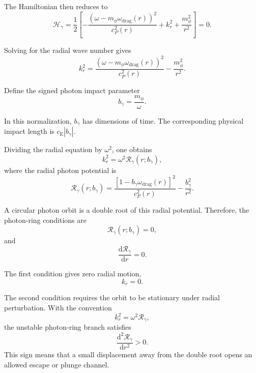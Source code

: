 The Hamiltonian then reduces to
\begin{equation}
    \mathcal{H}_{\gamma} = \frac{1}{2} \left[ - \frac{\left(\omega - m_{\phi}\omega_{\mathrm{drag}}(r)\right)^2}{c_P^2(r)} + k_r^2 + \frac{m_{\phi}^2}{r^2} \right] = 0.
\end{equation}

Solving for the radial wave number gives
\begin{equation}
    k_r^2 = \frac{\left(\omega - m_{\phi}\omega_{\mathrm{drag}}(r)\right)^2}{c_P^2(r)} - \frac{m_{\phi}^2}{r^2}.
\end{equation}

Define the signed photon impact parameter
\begin{equation}
    b_{\gamma} = \frac{m_{\phi}}{\omega}.
\end{equation}

In this normalization, $b_{\gamma}$ has dimensions of time. The corresponding physical impact length is $c_{\mathrm{E}}|b_{\gamma}|$.

Dividing the radial equation by $\omega^2$, one obtains
\begin{equation}
    k_r^2 = \omega^2 \mathcal{R}_{\gamma}(r;b_{\gamma}),
\end{equation}
where the radial photon potential is
\begin{equation}
    \mathcal{R}_{\gamma}(r;b_{\gamma}) = \frac{\left[ 1 - b_{\gamma}\omega_{\mathrm{drag}}(r) \right]^2}{c_P^2(r)} - \frac{b_{\gamma}^2}{r^2}.
\end{equation}

A circular photon orbit is a double root of this radial potential. Therefore, the photon-ring conditions are
\begin{equation}
    \mathcal{R}_{\gamma}(r;b_{\gamma}) = 0,
\end{equation}
and
\begin{equation}
    \frac{\mathrm{d}\mathcal{R}_{\gamma}}{\mathrm{d}r} = 0.
\end{equation}

The first condition gives zero radial motion,
\begin{equation}
    k_r = 0.
\end{equation}

The second condition requires the orbit to be stationary under radial perturbation. With the convention
\begin{equation}
    k_r^2 = \omega^2\mathcal{R}_{\gamma},
\end{equation}
the unstable photon-ring branch satisfies
\begin{equation}
    \frac{\mathrm{d}^2\mathcal{R}_{\gamma}}{\mathrm{d}r^2} > 0.
\end{equation}
This sign means that a small displacement away from the double root opens an allowed escape or plunge channel.

